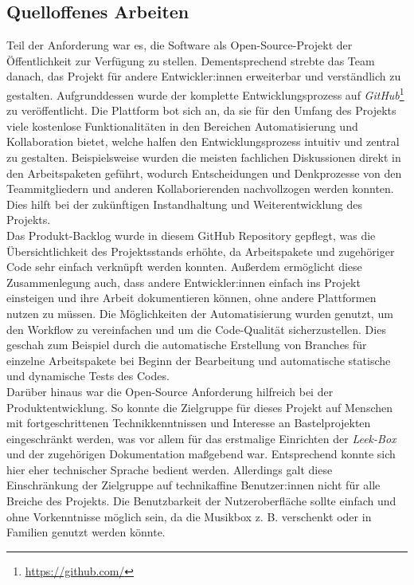 \documentclass[10pt, a4paper]{article}
\begin{document}
\begin{onehalfspace}
  \subsection{Quelloffenes Arbeiten}
  Teil der Anforderung war es, die Software als Open-Source-Projekt der Öffentlichkeit zur Verfügung zu stellen.
  Dementsprechend strebte das Team danach, das Projekt für andere Entwickler:innen erweiterbar und verständlich zu gestalten.
  Aufgrunddessen wurde der komplette Entwicklungsprozess auf \textit{GitHub}\footnote{\url{https://github.com/}} zu veröffentlicht.
  Die Plattform bot sich an, da sie für den Umfang des Projekts viele kostenlose Funktionalitäten in den Bereichen Automatisierung und Kollaboration bietet, welche halfen den Entwicklungsprozess intuitiv und zentral zu gestalten.
  Beispielsweise wurden die meisten fachlichen Diskussionen direkt in den Arbeitspaketen geführt, wodurch Entscheidungen und Denkprozesse von den Teammitgliedern und anderen Kollaborierenden nachvollzogen werden konnten.
  Dies hilft bei der zukünftigen Instandhaltung und Weiterentwicklung des Projekts.
  \\
  Das Produkt-Backlog wurde in diesem GitHub Repository gepflegt,
   was die Übersichtlichkeit des Projektsstands erhöhte, da Arbeitspakete und zugehöriger Code sehr einfach verknüpft werden konnten.
  Außerdem ermöglicht diese Zusammenlegung auch, dass andere Entwickler:innen einfach ins Projekt einsteigen und ihre Arbeit dokumentieren können, ohne andere Plattformen nutzen zu müssen.
  Die Möglichkeiten der Automatisierung wurden genutzt, um den Workflow zu vereinfachen und um die Code-Qualität sicherzustellen.
  Dies geschah zum Beispiel durch die automatische Erstellung von Branches für einzelne Arbeitspakete bei Beginn der Bearbeitung und automatische statische und dynamische Tests des Codes.
  \\
  Darüber hinaus war die Open-Source Anforderung hilfreich bei der Produktentwicklung.
  So konnte die Zielgruppe für dieses Projekt auf Menschen mit fortgeschrittenen Technikkenntnissen und Interesse an Bastelprojekten eingeschränkt werden,
   was vor allem für das erstmalige Einrichten der \textit{Leek-Box} und der zugehörigen Dokumentation maßgebend war.
  Entsprechend konnte sich hier eher technischer Sprache bedient werden.
  Allerdings galt diese Einschränkung der Zielgruppe auf technikaffine Benutzer:innen nicht für alle Breiche des Projekts.
  Die Benutzbarkeit der Nutzeroberfläche sollte einfach und ohne Vorkenntnisse möglich sein, da die Musikbox z. B. verschenkt oder in Familien genutzt werden könnte.


\end{onehalfspace}
\end{document}
